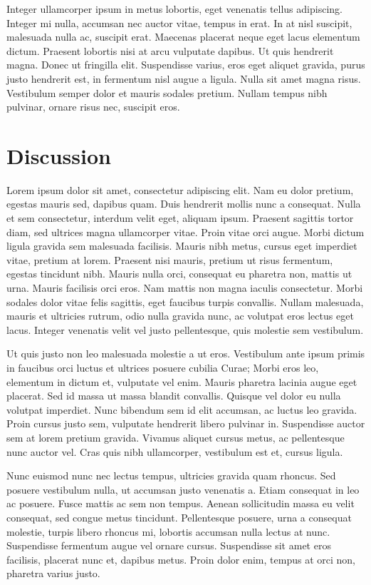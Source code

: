\documentclass[extra,mreferee]{gji}
\begin{document}
Integer ullamcorper ipsum in metus lobortis, eget venenatis tellus adipiscing.
Integer mi nulla, accumsan nec auctor vitae, tempus in erat. In at nisl
suscipit, malesuada nulla ac, suscipit erat. Maecenas placerat neque eget lacus
elementum dictum. Praesent lobortis nisi at arcu vulputate dapibus. Ut quis
hendrerit magna. Donec ut fringilla elit. Suspendisse varius, eros eget aliquet
gravida, purus justo hendrerit est, in fermentum nisl augue a ligula. Nulla sit
amet magna risus. Vestibulum semper dolor et mauris sodales pretium. Nullam
tempus nibh pulvinar, ornare risus nec, suscipit eros.

\section{Discussion}

Lorem ipsum dolor sit amet, consectetur adipiscing elit. Nam eu dolor pretium,
egestas mauris sed, dapibus quam. Duis hendrerit mollis nunc a consequat. Nulla
et sem consectetur, interdum velit eget, aliquam ipsum. Praesent sagittis
tortor diam, sed ultrices magna ullamcorper vitae. Proin vitae orci augue.
Morbi dictum ligula gravida sem malesuada facilisis. Mauris nibh metus, cursus
eget imperdiet vitae, pretium at lorem. Praesent nisi mauris, pretium ut risus
fermentum, egestas tincidunt nibh. Mauris nulla orci, consequat eu pharetra
non, mattis ut urna. Mauris facilisis orci eros. Nam mattis non magna iaculis
consectetur. Morbi sodales dolor vitae felis sagittis, eget faucibus turpis
convallis. Nullam malesuada, mauris et ultricies rutrum, odio nulla gravida
nunc, ac volutpat eros lectus eget lacus. Integer venenatis velit vel justo
pellentesque, quis molestie sem vestibulum.

Ut quis justo non leo malesuada molestie a ut eros. Vestibulum ante ipsum
primis in faucibus orci luctus et ultrices posuere cubilia Curae; Morbi eros
leo, elementum in dictum et, vulputate vel enim. Mauris pharetra lacinia augue
eget placerat. Sed id massa ut massa blandit convallis. Quisque vel dolor eu
nulla volutpat imperdiet. Nunc bibendum sem id elit accumsan, ac luctus leo
gravida. Proin cursus justo sem, vulputate hendrerit libero pulvinar in.
Suspendisse auctor sem at lorem pretium gravida. Vivamus aliquet cursus metus,
ac pellentesque nunc auctor vel. Cras quis nibh ullamcorper, vestibulum est et,
cursus ligula.

Nunc euismod nunc nec lectus tempus, ultricies gravida quam rhoncus. Sed
posuere vestibulum nulla, ut accumsan justo venenatis a. Etiam consequat in leo
ac posuere. Fusce mattis ac sem non tempus. Aenean sollicitudin massa eu velit
consequat, sed congue metus tincidunt. Pellentesque posuere, urna a consequat
molestie, turpis libero rhoncus mi, lobortis accumsan nulla lectus at nunc.
Suspendisse fermentum augue vel ornare cursus. Suspendisse sit amet eros
facilisis, placerat nunc et, dapibus metus. Proin dolor enim, tempus at orci
non, pharetra varius justo.
\end{document}
